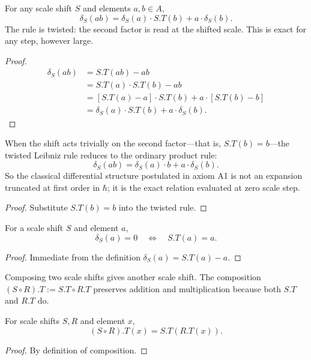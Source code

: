 \begin{theorem}
For any scale shift $S$ and elements $a, b \in A$,
\[
\delta_S(ab) = \delta_S(a) \cdot S.T(b) + a \cdot \delta_S(b) .
\]
The rule is twisted: the second factor is read at the shifted scale. This is exact for any step, however large.
\begin{proof}
\begin{align}
\delta_S(ab) &= S.T(ab) - ab \\
&= S.T(a) \cdot S.T(b) - ab \\
&= [S.T(a) - a] \cdot S.T(b) + a \cdot [S.T(b) - b] \\
&= \delta_S(a) \cdot S.T(b) + a \cdot \delta_S(b) .
\end{align}
\end{proof}
\end{theorem}

\begin{theorem}
When the shift acts trivially on the second factor—that is, $S.T(b) = b$—the twisted Leibniz rule reduces to the ordinary product rule:
\[
\delta_S(ab) = \delta_S(a) \cdot b + a \cdot \delta_S(b) .
\]
So the classical differential structure postulated in axiom A1 is not an expansion truncated at first order in $\hbar$; it is the exact relation evaluated at zero scale step.
\begin{proof}
Substitute $S.T(b) = b$ into the twisted rule.
\end{proof}
\end{theorem}

\begin{theorem}
For a scale shift $S$ and element $a$,
\[
\delta_S(a) = 0 \quad \iff \quad S.T(a) = a .
\]
\begin{proof}
Immediate from the definition $\delta_S(a) = S.T(a) - a$.
\end{proof}
\end{theorem}

\begin{definition}
Composing two scale shifts gives another scale shift. The composition $(S \circ R).T := S.T \circ R.T$ preserves addition and multiplication because both $S.T$ and $R.T$ do.
\end{definition}

\begin{theorem}
For scale shifts $S, R$ and element $x$,
\[
(S \circ R).T(x) = S.T(R.T(x)) .
\]
\begin{proof}
By definition of composition.
\end{proof}
\end{theorem}

